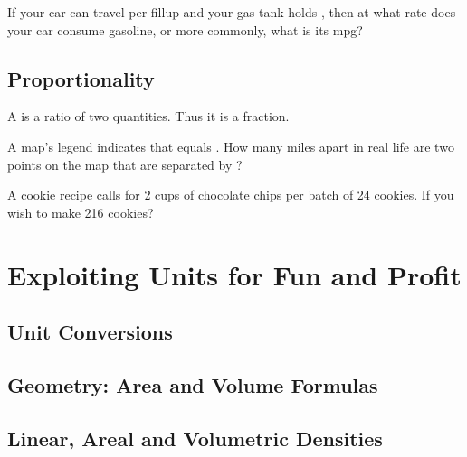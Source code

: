 \begin{exercise}
  If your car can travel  per fillup and your gas tank
  holds , then at what rate does your car consume
  gasoline, or more commonly, what is its mpg?

\end{exercise}

\subsection{Proportionality}
\label{sub:proportionality}

\begin{definition}
  A  is a ratio of two quantities. Thus it is a fraction.
\end{definition}

\begin{exercise}
  A map's legend indicates that  equals
  . How many miles apart in real life are two points on
  the map that are separated by ?

\end{exercise}

\begin{exercise}
  A cookie recipe calls for 2 cups of chocolate chips per batch of 24
  cookies. If you wish to make 216 cookies?

\end{exercise}


\section{Exploiting Units for Fun and Profit}
\label{sec:exploiting-units}

\subsection{Unit Conversions}
\label{sub:unit-conversions}

\subsection{Geometry: Area and Volume Formulas}


\subsection{Linear, Areal and Volumetric Densities}
\label{sub:densities}





